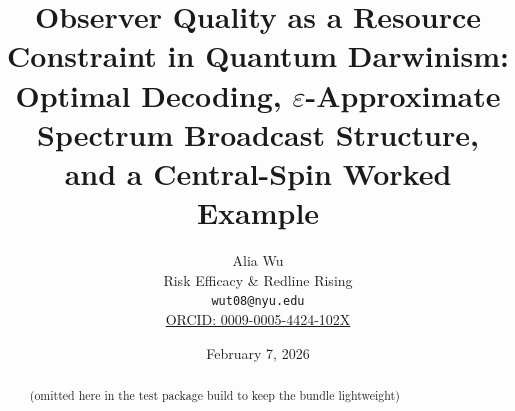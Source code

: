 \documentclass[11pt]{article}
\title{\bf Observer Quality as a Resource Constraint in Quantum Darwinism:\\
Optimal Decoding, $\varepsilon$-Approximate Spectrum Broadcast Structure,\\
and a Central-Spin Worked Example}
\author{
Alia Wu\\
Risk Efficacy \& Redline Rising\\
\texttt{wut08@nyu.edu}\\
\href{https://orcid.org/0009-0005-4424-102X}{ORCID: 0009-0005-4424-102X}
}
\date{February 7, 2026}
\newcommand{\1}{\mathbf{1}}
\theoremstyle{definition}
\theoremstyle{plain}
\begin{document}
\maketitle


\begin{abstract}
(omitted here in the test package build to keep the bundle lightweight)
\end{abstract}
\end{document}
